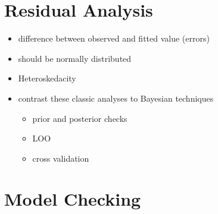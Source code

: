 \documentclass[
]{article}
\providecommand{\tightlist}{%
  \setlength{\itemsep}{0pt}\setlength{\parskip}{0pt}}
\begin{document}
\hypertarget{ch7}{%
\section{Residual Analysis}\label{ch7}}

\begin{itemize}
\tightlist
\item
  difference between observed and fitted value (errors)
\item
  should be normally distributed
\item
  Heteroskedacity
\item
  contrast these classic analyses to Bayesian techniques

  \begin{itemize}
  \tightlist
  \item
    prior and posterior checks
  \item
    LOO
  \item
    cross validation
  \end{itemize}
\end{itemize}

\hypertarget{ch8}{%
\section{Model Checking}\label{ch8}}
\end{document}
